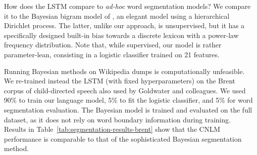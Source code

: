 How does the LSTM compare to \emph{ad-hoc} word segmentation models?
We compare it to the Bayesian bigram model of
, an elegant model using a
hierarchical Dirichlet process.  The latter, unlike our approach, is
unsupervised, but it has a specifically designed built-in bias towards
a discrete lexicon with a power-law frequency distribution. Note that,
while supervised, our model is rather parameter-lean, consisting in a
logistic classifier trained on 21 features.

Running Bayesian methods on Wikipedia dumps is computationally
unfeasible. We re-trained instead the LSTM (with fixed
hyperparameters) on the Brent corpus of child-directed speech
\cite{brent-efficient-1999} also used by Goldwater and colleagues.  We
used 90\% to train our language model, 5\% to fit the logistic
classifier, and 5\% for word segmentation evaluation.  The Bayesian
model is trained and evaluated on the full dataset, as it does not
rely on word boundary information during training. Results in
Table~\ref{tab:segmentation-results-brent} show that the CNLM
performance is comparable to that of the sophisticated Bayesian
segmentation method.



